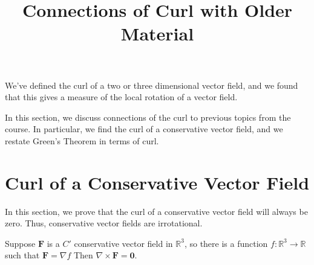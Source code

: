 \documentclass{ximera}
\title{Connections of Curl with Older Material}
\begin{document}
  
\begin{abstract}  
\end{abstract}  
\maketitle 

We've defined the curl of a two or three dimensional vector field, and we found that this gives a measure of the local rotation of a vector field.

In this section, we discuss connections of the curl to previous topics from the course. In particular, we find the curl of a conservative vector field, and we restate Green's Theorem in terms of curl.

\section{Curl of a Conservative Vector Field}

In this section, we prove that the curl of a conservative vector field will always be zero. Thus, conservative vector fields are irrotational.

\begin{theorem}
Suppose $\mathbf{F}$ is a $C'$ conservative vector field in $\mathbb{R}^3$, so there is a function $f:\mathbb{R}^3\rightarrow\mathbb{R}$ such that $\mathbf{F}=\nabla f$ Then $\nabla\times\mathbf{F} = \mathbf{0}$.
\end{theorem}
\end{document}
